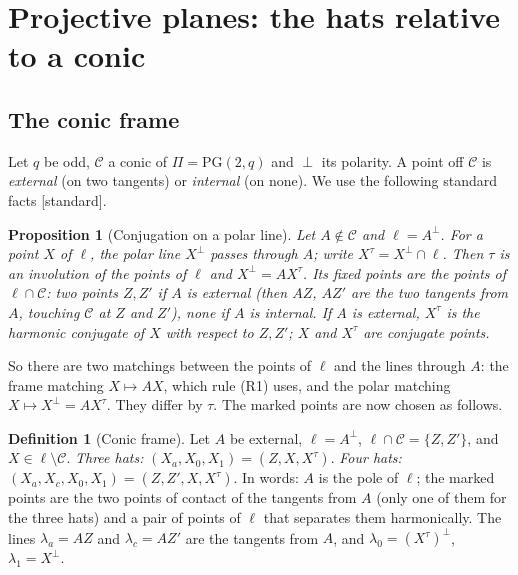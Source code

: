 \documentclass[11pt]{amsart}
\newtheorem{proposition}[theorem]{Proposition}
\theoremstyle{definition}
\newtheorem{definition}[theorem]{Definition}
\theoremstyle{remark}
\newcommand{\cC}{\mathcal{C}}
\newcommand{\lam}{\lambda}
\newcommand{\PG}{\mathrm{PG}}
\newcommand{\status}[1]{\textup{[#1]}}
\begin{document}
\section{Projective planes: the hats relative to a conic}

\subsection{The conic frame}
Let $q$ be odd, $\cC$ a conic of $\Pi=\PG(2,q)$ and $\perp$ its polarity. A point off $\cC$ is \emph{external}
(on two tangents) or \emph{internal} (on none). We use the following standard facts \status{standard}.

\begin{proposition}[Conjugation on a polar line]\label{prop:conj}
Let $A\notin\cC$ and $\ell=A^\perp$. For a point $X$ of $\ell$, the polar line $X^\perp$ passes through $A$; write
$X^\tau=X^\perp\cap\ell$. Then $\tau$ is an involution of the points of $\ell$ and $X^\perp=AX^\tau$. Its fixed
points are the points of $\ell\cap\cC$: two points $Z,Z'$ if $A$ is external (then $AZ$, $AZ'$ are the two tangents
from $A$, touching $\cC$ at $Z$ and $Z'$), none if $A$ is internal. If $A$ is external, $X^\tau$ is the harmonic
conjugate of $X$ with respect to $Z,Z'$; $X$ and $X^\tau$ are \emph{conjugate} points.
\end{proposition}

So there are two matchings between the points of $\ell$ and the lines through $A$: the frame matching
$X\mapsto AX$, which rule (R1) uses, and the polar matching $X\mapsto X^\perp=AX^\tau$. They differ by $\tau$.
The marked points are now chosen as follows.

\begin{definition}[Conic frame]\label{def:frame}
Let $A$ be external, $\ell=A^\perp$, $\ell\cap\cC=\{Z,Z'\}$, and $X\in\ell\setminus\cC$.
\emph{Three hats:} $(X_a,X_0,X_1)=(Z,X,X^\tau)$. \emph{Four hats:} $(X_a,X_c,X_0,X_1)=(Z,Z',X,X^\tau)$.
In words: $A$ is the pole of $\ell$; the marked points are the two points of contact of the tangents from $A$ (only
one of them for the three hats) and a pair of points of $\ell$ that separates them harmonically. The lines
$\lam_a=AZ$ and $\lam_c=AZ'$ are the tangents from $A$, and $\lam_0=(X^\tau)^\perp$, $\lam_1=X^\perp$.
\end{definition}
\end{document}
